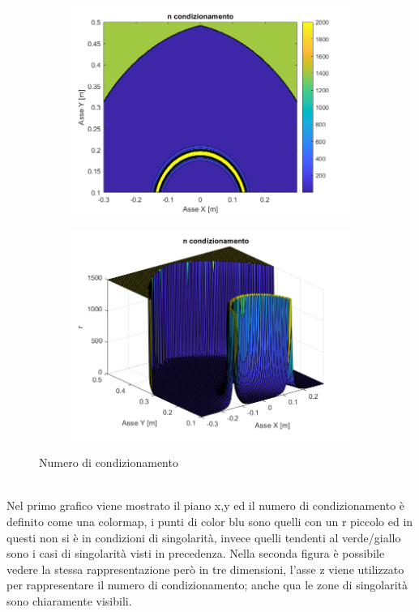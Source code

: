 \begin{figure}[!ht]
	\begin{subfigure}{.55\textwidth}
		\centering
		\includegraphics[width=.9\linewidth]{Immagini/Singolarity/Ncond}
		\label{fig:ncond}
	\end{subfigure}
	\begin{subfigure}{.55\textwidth}
		\centering
		\includegraphics[width=.9\linewidth]{Immagini/Singolarity/Ncond_surf}  
		\label{fig:nconds}
	\end{subfigure}
	\caption{Numero di condizionamento}
	\label{NumCondiz}
\end{figure}
\\Nel primo grafico viene mostrato il piano x,y ed il numero di condizionamento è definito come una colormap, i punti di color blu sono quelli con un r piccolo ed in questi non si è in condizioni di singolarità, invece quelli tendenti al verde/giallo sono i casi di singolarità visti in precedenza. Nella seconda figura è possibile vedere la stessa rappresentazione però in tre dimensioni, l'asse z viene utilizzato per rappresentare il numero di condizionamento; anche qua le zone di singolarità sono chiaramente visibili.

